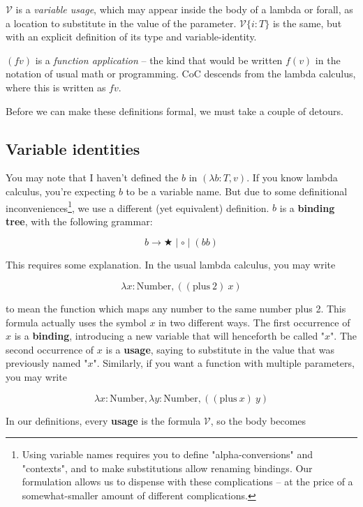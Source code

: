 \documentclass{article}
\newcommand{\usage}{\mathcal{V}}
\newcommand{\usageKnown}[2]{\usage\{#2:#1\}}
\newcommand{\bindvariable}{\bigstar}
\newcommand{\bindnotthis}{\circ}
\begin{document}
  $\usage$ is a \emph{variable usage}, which may appear inside the body of a lambda or forall, as a location to substitute in the value of the parameter. $\usageKnown{T}{i}$ is the same, but with an explicit definition of its type and variable-identity.
  
  $(f v)$ is a \emph{function application} – the kind that would be written $f(v)$ in the notation of usual math or programming. CoC descends from the lambda calculus, where this is written as $f v$.
  
  Before we can make these definitions formal, we must take a couple of detours.
  
  

  \subsection{Variable identities}

  You may note that I haven't defined the $b$ in $(\lambda b:T,v)$. If you know lambda calculus, you're expecting $b$ to be a variable name. But due to some definitional inconveniences\footnote{Using variable names requires you to define "alpha-conversions" and "contexts", and to make substitutions allow renaming bindings. Our formulation allows us to dispense with these complications – at the price of a somewhat-smaller amount of different complications.}, we use a different (yet equivalent) definition. $b$ is a \textbf{binding tree}, with the following grammar:

  \[b \rightarrow \bindvariable \mid \bindnotthis \mid (b b) \]

  This requires some explanation. In the usual lambda calculus, you may write

  \[ \lambda x : \mathrm{Number}, ((\mathrm{plus}\ 2)\ x) \]

  to mean the function which maps any number to the same number plus 2. This formula actually uses the symbol $x$ in two different ways. The first occurrence of $x$ is a \textbf{binding}, introducing a new variable that will henceforth be called "$x$". The second occurrence of $x$ is a \textbf{usage}, saying to substitute in the value that was previously named "$x$". Similarly, if you want a function with multiple parameters, you may write
  
  \[ \lambda x : \mathrm{Number}, \lambda y : \mathrm{Number}, ((\mathrm{plus}\ x)\ y) \]

  In our definitions, every \textbf{usage} is the formula $\usage$, so the body becomes
  
\end{document}
